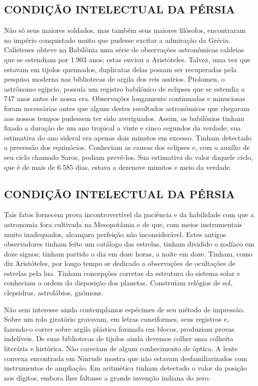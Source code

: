 \documentclass[11pt,a5paper,twoside,openany]{book}
\begin{document}
\subsection*{CONDIÇÃO INTELECTUAL DA PÉRSIA}
Não só seus maiores soldados, mas também seus maiores filósofos, encontraram no império conquistado muito que pudesse excitar a admiração da Grécia. Calístenes obteve na Babilônia uma série de observações astronômicas caldeias que se estendiam por 1.903 anos; estas enviou a Aristóteles. Talvez, uma vez que estavam em tijolos queimados, duplicatas delas possam ser recuperadas pela pesquisa moderna nas bibliotecas de argila dos reis assírios. Ptolomeu, o astrônomo egípcio, possuía um registro babilônico de eclipses que se estendia a 747 anos antes de nossa era. Observações longamente continuadas e minuciosas foram necessárias antes que alguns destes resultados astronômicos que chegaram aos nossos tempos pudessem ter sido averiguados. Assim, os babilônios tinham fixado a duração de um ano tropical a vinte e cinco segundos da verdade; sua estimativa do ano sideral era apenas dois minutos em excesso. Tinham detectado a precessão dos equinócios. Conheciam as causas dos eclipses e, com o auxílio de seu ciclo chamado Saros, podiam prevê-los. Sua estimativa do valor daquele ciclo, que é de mais de 6.585 dias, estava a dezenove minutos e meio da verdade.

\subsection*{CONDIÇÃO INTELECTUAL DA PÉRSIA}
Tais fatos fornecem prova incontrovertível da paciência e da habilidade com que a astronomia fora cultivada na Mesopotâmia e de que, com meios instrumentais muito inadequados, alcançara perfeição não inconsiderável. Estes antigos observadores tinham feito um catálogo das estrelas, tinham dividido o zodíaco em doze signos; tinham partido o dia em doze horas, a noite em doze. Tinham, como diz Aristóteles, por longo tempo se dedicado a observações de ocultações de estrelas pela lua. Tinham concepções corretas da estrutura do sistema solar e conheciam a ordem da disposição dos planetas. Construíam relógios de sol, clepsidras, astrolábios, gnômons.

Não sem interesse ainda contemplamos espécimes de seu método de impressão. Sobre um rolo giratório gravavam, em letras cuneiformes, seus registros e, fazendo-o correr sobre argila plástica formada em blocos, produziam provas indelíveis. De suas bibliotecas de tijolos ainda devemos colher uma colheita literária e histórica. Não careciam de algum conhecimento de óptica. A lente convexa encontrada em Ninrude mostra que não estavam desfamiliarizados com instrumentos de ampliação. Em aritmética tinham detectado o valor da posição nos dígitos, embora lhes faltasse a grande invenção indiana do zero.
\end{document}
